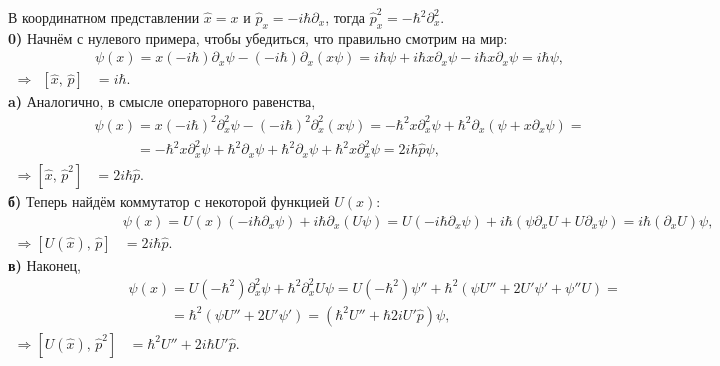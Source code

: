 


В координатном представлении $\hat{x} = x$ и $\hat{p}_x = - i \hbar \partial_x$, тогда $\hat{p}_x^2 = - \hbar^2 \partial_x^{2}$. 
\\
\textbf{0)} Начнём с нулевого примера, чтобы убедиться, что правильно смотрим на мир:
\begin{align*}
    [\hat{x},\, \hat{p}] &\psi(x) = 
    x (-i \hbar) \partial_x \psi - (-i \hbar) \partial_x (x \psi) = i \hbar \psi + i \hbar x \partial_x \psi - i \hbar x \partial_x \psi = i \hbar \psi,  \\ 
    \Rightarrow \ \ [\hat{x},\, \hat{p}] &= i \hbar.
\end{align*}
\textbf{a)} Аналогично, в смысле операторного равенства,
\begin{align*}
    [\hat{x},\, \hat{p}^2] &\psi(x) 
    = 
    x (-i \hbar)^2 \partial_x^2 \psi - (-i \hbar)^2 \partial_x^2 (x \psi) 
    = 
    - \hbar^2 x \partial_x^2 \psi + \hbar^2 \partial_x (\psi + x \partial_x \psi) 
    = \\ &\phantom{\psi(x)}= 
    - \hbar^2 x \partial_x^2 \psi + \hbar^2 \partial_x \psi + \hbar^2 \partial_x \psi + \hbar^2 x \partial_x^2 \psi = 2 i \hbar \hat{p} \psi,
    \\ \Rightarrow [\hat{x},\, \hat{p}^2] &= 2 i \hbar \hat{p}.
\end{align*}
\textbf{б)} Теперь найдём коммутатор с некоторой функцией $U(x)$:
\begin{align*}
    [U(\hat{x}),\, \hat{p}]&\psi(x) 
    = 
    U(x) (- i \hbar \partial_x \psi) + i \hbar \partial_x (U \psi) 
    = 
    U (- i \hbar \partial_x \psi) + i \hbar  (\psi \partial_x U + U \partial_x \psi)
    = 
    i \hbar (\partial_x U) \psi,
    \\ \Rightarrow [U(\hat{x}),\, \hat{p}] &= 2 i \hbar \hat{p}.
\end{align*}
\textbf{в)} Наконец, 
\begin{align*}
    [U(\hat{x}),\, \hat{p}^2]&\psi(x) 
    = 
    U (-\hbar^2) \partial_x^2 \psi + \hbar^2 \partial_x^2 U \psi
    =
    U (- \hbar^2) \psi'' + \hbar^2 (\psi U'' + 2 U' \psi' + \psi'' U) 
    = \\ &\phantom{\psi(x)}= 
    \hbar^2 (\psi U'' + 2 U' \psi') 
    =
    (\hbar^2 U'' + \hbar 2i U' \hat{p} )\psi,
    \\ \Rightarrow [U(\hat{x}),\, \hat{p}^2] &= \hbar^2 U'' + 2 i \hbar U' \hat{p}.
\end{align*}